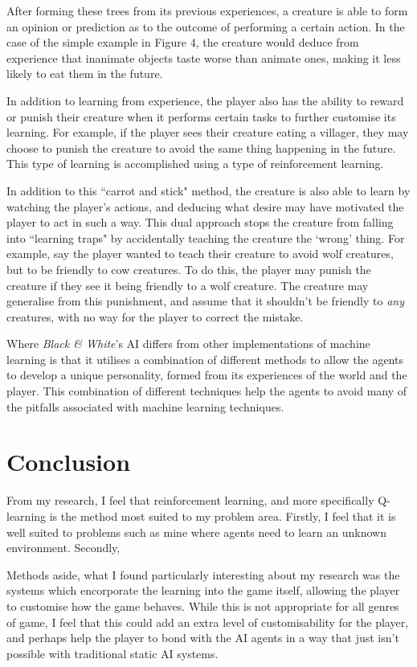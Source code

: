 \documentclass[a4paper,oneside]{report}
\begin{document}
After forming these trees from its previous experiences, a creature is able to form an opinion or prediction as to the outcome of performing a certain action. In the case of the simple example in Figure 4, the creature would deduce from experience that inanimate objects taste worse than animate ones, making it less likely to eat them in the future. 

In addition to learning from experience, the player also has the ability to reward or punish their creature when it performs certain tasks to further customise its learning. For example, if the player sees their creature eating a villager, they may choose to punish the creature to avoid the same thing happening in the future. This type of learning is accomplished using a type of reinforcement learning. 

In addition to this ``carrot and stick" method, the creature is also able to learn by watching the player's actions, and deducing what desire may have motivated the player to act in such a way. This dual approach stops the creature from falling into ``learning traps" by accidentally teaching the creature the `wrong' thing. For example, say the player wanted to teach their creature to avoid wolf creatures, but to be friendly to cow creatures. To do this, the player may punish the creature if they see it being friendly to a wolf creature. The creature may generalise from this punishment, and assume that it shouldn't be friendly to \emph{any} creatures, with no way for the player to correct the mistake. 

Where \emph{Black \& White}'s AI differs from other implementations of machine learning is that it utilises a combination of different methods to allow the agents to develop a unique personality, formed from its experiences of the world and the player. This combination of different techniques help the agents to avoid many of the pitfalls associated with machine learning techniques.

\section{Conclusion}

From my research, I feel that reinforcement learning, and more specifically Q-learning is the method most suited to my problem area. Firstly, I feel that it is well suited to problems such as mine where agents need to learn an unknown environment. Secondly, 

Methods aside, what I found particularly interesting about my research was the systems which encorporate the learning into the game itself, allowing the player to customise how the game behaves. While this is not appropriate for all genres of game, I feel that this could add an extra level of customisability for the player, and perhaps help the player to bond with the AI agents in a way that just isn't possible with traditional static AI systems.
\end{document}
